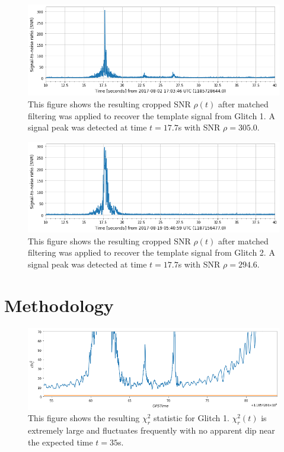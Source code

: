 \documentclass[preprint,
letterpaper,
 amsmath,amssymb,
 aps,
]{revtex4-2}
\begin{document}
\begin{figure}[t]
\includegraphics[width = .9\textwidth]{glitch loud 69 template 1.png}
\caption{This figure shows the resulting cropped SNR $\rho(t)$ after matched filtering was applied to recover the template signal from Glitch 1. A signal peak was detected at time $t = 17.7$s with SNR $\rho = 305.0$.}
\centering
\end{figure}

\begin{figure}[t]
\includegraphics[width = .9\textwidth]{glitch loud 02 template 1.png}
\caption{This figure shows the resulting cropped SNR $\rho(t)$ after matched filtering was applied to recover the template signal from Glitch 2. A signal peak was detected at time $t = 17.7$s with SNR $\rho = 294.6$.}
\centering
\end{figure}

\section{Methodology} \label{method}

\begin{figure}[t]
\includegraphics[width = .9\textwidth]{chi2 glitch 1 zoomed.png}
\caption{This figure shows the resulting $\chi^2_r$ statistic for Glitch 1. $\chi_r^2(t)$ is extremely large and fluctuates frequently with no apparent dip near the expected time $t=35$s.}
\centering
\end{figure} 
\end{document}
